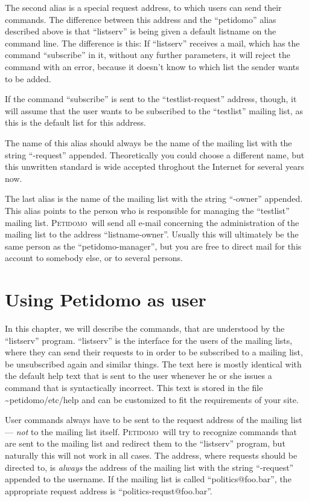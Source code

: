 \documentclass[a4paper,10pt]{scrreprt}
\newcommand{\Petidomo}{{\scshape Peti\-domo}}
\newcommand{\file}[1]{{\sf #1}}
\begin{document}
The second alias is a special request address, to which users can send
their commands. The difference between this address and the
``petidomo'' alias described above is that ``listserv'' is being given
a default listname on the command line. The difference is this: If
``listserv'' receives a mail, which has the command ``subscribe'' in
it, without any further parameters, it will reject the command with an
error, because it doesn't know to which list the sender wants to be
added.

If the command ``subscribe'' is sent to the ``testlist-request''
address, though, it will assume that the user wants to be subscribed
to the ``testlist'' mailing list, as this is the default list for this
address.

The name of this alias should always be the name of the mailing list
with the string ``-request'' appended. Theoretically you could choose
a different name, but this unwritten standard is wide accepted
throghout the Internet for several years now.

The last alias is the name of the mailing list with the string
``-owner'' appended. This alias points to the person who is
responsible for managing the ``testlist'' mailing list. \Petidomo\
will send all e-mail concerning the administration of the mailing list
to the address ``listname-owner''. Usually this will ultimately be the
same person as the ``petidomo-manager'', but you are free to direct
mail for this account to somebody else, or to several persons.

\chapter{Using Petidomo as user}
\label{petidomo as user}

In this chapter, we will describe the commands, that are
understood by the ``listserv'' program. ``listserv'' is the interface
for the users of the mailing lists, where they can send their requests
to in order to be subscribed to a mailing list, be unsubscribed again
and similar things. The text here is mostly identical with the
default help text that is sent to the user
whenever he or she issues a command that is syntactically incorrect.
This text is stored in the file
\file{\~{}petidomo/etc/help} and can be
customized to fit the requirements of your site.

User commands always have to be sent to the request address of
the mailing list --- \emph{not} to the mailing list itself. \Petidomo\
will try to recognize commands that are sent to the mailing list and
redirect them to the ``listserv'' program, but naturally this will not
work in all cases. The address, where requests should be directed to,
is \emph{always} the address of the mailing list with the string
``-request'' appended to the username. If the mailing list is called
``politics@foo.bar'', the appropriate request address is
``politics-requst@foo.bar''.
\end{document}
